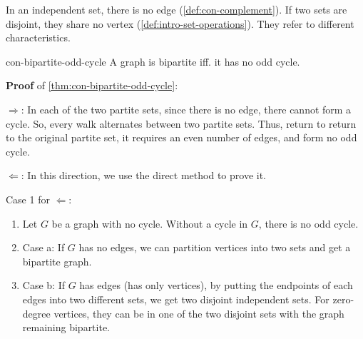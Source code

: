 \documentclass[../src/handouts/main.tex]{subfiles}
\begin{document}
In an independent set, there is no edge (\cref{def:con-complement}). If two sets are disjoint, they share no vertex (\cref{def:intro-set-operations}). They refer to different characteristics.

\begin{theorem}{}{con-bipartite-odd-cycle}
  A graph is bipartite iff. it has no odd cycle.
\end{theorem}

\textbf{Proof} of \cref{thm:con-bipartite-odd-cycle}:

$\Rightarrow$: In each of the two partite sets, since there is no edge, there cannot form a cycle. So, every walk alternates between two partite sets. Thus, return to return to the original partite set, it requires an even number of edges, and form no odd cycle.

$\Leftarrow$: In this direction, we use the direct method to prove it.

Case 1 for $\Leftarrow$:
\begin{enumerate}
  \item Let $G$ be a graph with no cycle. Without a cycle in $G$, there is no odd cycle.
  \item Case a: If $G$ has no edges, we can partition vertices into two sets and get a bipartite graph.
  \item Case b: If $G$ has edges (has only vertices), by putting the endpoints of each edges into two different sets, we get two disjoint independent sets. For zero-degree vertices, they can be in one of the two disjoint sets with the graph remaining bipartite.
\end{enumerate}
\end{document}
